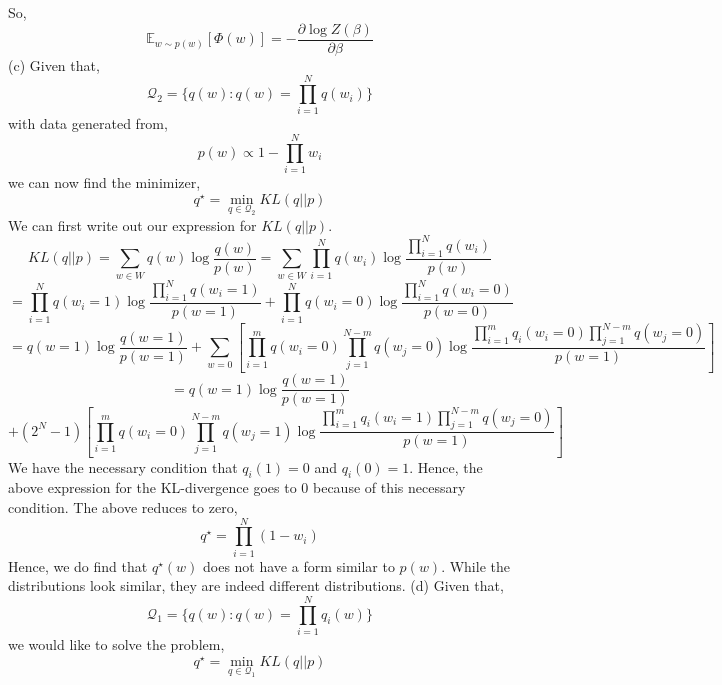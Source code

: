 \documentclass[12pt]{article}
\begin{document}
So, 
$$\mathbb{E}_{w \sim p(w) }  [\Phi (w)  ]  = - \frac{\partial \log Z(\beta )  }{ \partial \beta } $$
\newline \newline 
(c) Given that, 
$$\mathcal{Q}_{2} = \{ q(w): q(w) = \prod_{i=1}^{N}  q  (w_{i} )   \}   $$
with data generated from, 
$$ p(w) \propto 1 - \prod_{i =1}^{N} w_{i}  $$
we can now find the minimizer, 
$$ q^{\star} = \min_{ q \in \mathcal{Q}_{2}  } KL (q|| p )  $$
We can first write out our expression for $KL (q|| p )$.  
$$ KL (q|| p )  = \sum_{w \in W} q(w) \log \frac{q(w)}{ p(w)}   =  \sum_{w \in W} \prod_{i=1}^{N}  q (w_{i} )  \log \frac{\prod_{i=1}^{N}  q (w_{i} )   }{ p (w)  }   $$
$$ =     \prod_{i=1}^{N}  q(w_{i} = 1)  \log \frac{\prod_{i=1}^{N}  q (w_{i} =1 )   }{ p (w = 1)  }    +     \prod_{i=1}^{N}  q(w_{i} =0 )  \log \frac{\prod_{i=1}^{N}  q (w_{i} = 0 )   }{ p (w = 0 )  }   $$
$$ = q (w = 1)  \log \frac{ q (w =1 )   }{ p (w = 1)  } +   \sum_{w = 0 }  [\prod_{i=1}^{m}  q(w_{i} =0 )  \prod_{j=1}^{N-m}  q (w_{j} =0 ) \log   \frac{ \prod_{i=1}^{m}  q_{i} (w_{i} =0 )  \prod_{j=1}^{N-m}  q (w_{j} =0 )  }{ p (w = 1)  } ]  $$
$$ = q (w = 1)  \log \frac{ q (w =1 )   }{ p (w = 1)  } $$
$$+ (2^{N} -1) [\prod_{i=1}^{m}  q (w_{i} =0 )  \prod_{j=1}^{N-m}  q(w_{j} =1 ) \log   \frac{ \prod_{i=1}^{m}  q_{i} (w_{i} =1 )  \prod_{j=1}^{N-m}  q (w_{j} =0 )  }{ p (w = 1)  } ]  $$
We have the necessary condition that $q_{i} (1) = 0$ and $q_{i} (0) = 1$. Hence, the above expression for the KL-divergence goes to 0 because of this necessary condition. The above reduces to zero, 
$$q^{\star} = \prod_{i=1}^{N} ( 1 - w_{i} )   $$
Hence, we do find that $q^{\star} (w)$  does not have a form similar to $p(w)$.  While the distributions look similar, they are indeed different distributions. \newline  \newline 
(d) Given that,
$$\mathcal{Q}_{1} = \{ q(w): q(w) = \prod_{i=1}^{N}  q_{i}  (w )   \}   $$ 
we would like to solve the problem, 
$$ q^{\star} = \min_{ q \in \mathcal{Q}_{1}  } KL (q|| p )  $$
\end{document}
